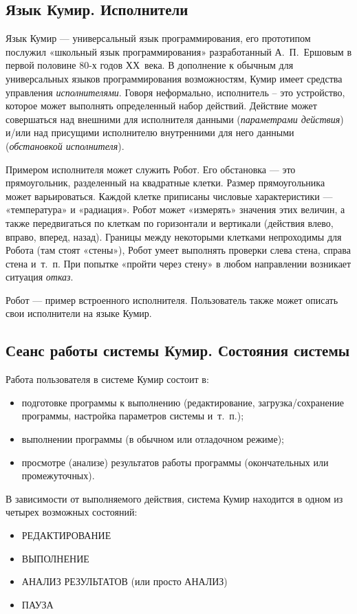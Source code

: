 \subsection{Язык Кумир. Исполнители}

Язык Кумир --- универсальный язык программирования, его прототипом послужил «школьный язык программирования» разработанный А.~П.~Ершовым в первой половине 80-х годов ХХ~века. В дополнение к обычным для универсальных языков программирования возможностям, Кумир имеет средства управления \emph{исполнителями}. Говоря неформально, исполнитель – это устройство, которое может выполнять определенный набор действий. Действие может совершаться над внешними для исполнителя данными (\emph{параметрами действия}) и/или над присущими исполнителю внутренними для него данными (\emph{обстановкой исполнителя}).

Примером исполнителя может служить Робот. Его обстановка --- это прямоугольник, разделенный на квадратные клетки. Размер прямоугольника может варьироваться. Каждой клетке приписаны числовые характеристики --- «температура» и «радиация». Робот может «измерять» значения этих величин, а также передвигаться по клеткам по горизонтали и вертикали (действия \textsf{влево}, \textsf{вправо}, \textsf{вперед}, \textsf{назад}). Границы между некоторыми клетками непроходимы для Робота (там стоят «стены»), Робот умеет выполнять проверки \textsf{слева стена}, \textsf{справа стена} и~т.~п. При попытке «пройти через стену» в любом направлении возникает ситуация \emph{отказ}.

Робот --- пример встроенного исполнителя. Пользователь также может описать свои исполнители на языке Кумир.

\subsection{Сеанс работы системы Кумир. Состояния системы}

Работа пользователя  в системе Кумир состоит в:
\begin{itemize}
\item подготовке программы к выполнению (редактирование, загрузка/сохранение программы, настройка параметров системы и~т.~п.);
\item выполнении программы (в обычном или отладочном режиме);
\item просмотре (анализе) результатов работы программы (окончательных или промежуточных).
\end{itemize}

В зависимости от выполняемого действия, система Кумир находится в одном из четырех возможных состояний:
\begin{itemize}
\item РЕДАКТИРОВАНИЕ
\item ВЫПОЛНЕНИЕ
\item АНАЛИЗ РЕЗУЛЬТАТОВ (или просто АНАЛИЗ)
\item ПАУЗА
\end{itemize}

